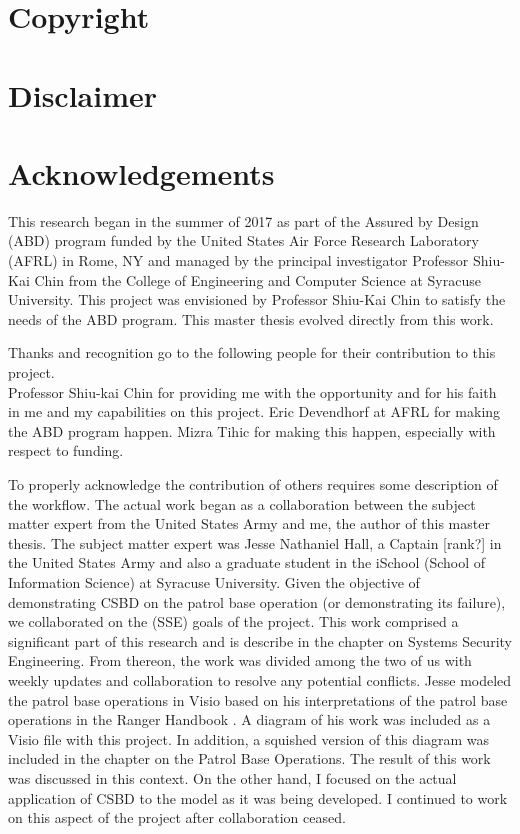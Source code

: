 \documentclass[../main/main.tex]{subfiles}
\begin{document}
\section*{Copyright}
\cleardoublepage

\section*{Disclaimer}
\cleardoublepage

\section*{Acknowledgements}
This research began in the summer of 2017 as part of the Assured by Design (ABD) program funded by the United States Air Force Research Laboratory (AFRL) in Rome, NY and managed by the principal investigator Professor Shiu-Kai Chin from the College of Engineering and Computer Science at Syracuse University.  This project was envisioned by Professor Shiu-Kai Chin to satisfy the needs of the ABD program.  This master thesis evolved directly from this work.

Thanks and recognition go to the following people for their contribution to this project.\\
Professor Shiu-kai Chin for providing me with the opportunity and for his faith in me and my capabilities on this project.  Eric Devendhorf at AFRL for making the ABD program happen. Mizra Tihic for making this happen, especially with respect to funding.

To properly acknowledge the contribution of others requires some description of the workflow.  The actual work began as a collaboration between the subject matter expert from the United States Army and me, the author of this master thesis.  The subject matter expert was Jesse Nathaniel Hall, a Captain [rank?] in the United States Army and also a graduate student in the iSchool (School of Information Science) at Syracuse University. Given the objective of demonstrating CSBD on the patrol base operation (or demonstrating its failure), we collaborated on the  (SSE) goals of the project.  This work comprised a significant part of this research and is describe in the chapter on Systems Security Engineering.  From thereon, the work was divided among the two of us with weekly updates and collaboration to resolve any potential conflicts.   Jesse modeled the patrol base operations in Visio based on his interpretations of the patrol base operations in the Ranger Handbook \cite{rangermanual}.  A diagram of his work was included as a Visio file with this project.  In addition, a squished version of this diagram was included in the chapter on the Patrol Base Operations.  The result of this work was discussed in this context.   On the other hand, I focused on the actual application of CSBD to the model as it was being developed.  I continued to work on this aspect of the project after collaboration ceased.  
\end{document}
